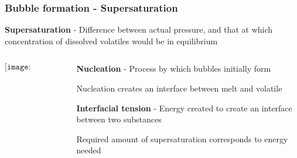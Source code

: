 \documentclass{beamer}
\begin{document}
\begin{frame}
  \frametitle{Bubble formation - Supersaturation}

  \textbf{Supersaturation} - Difference between actual pressure, and that at which concentration of dissolved volatiles would be in equilibrium

  \begin{columns}[t]

    \begin{column}{0.5\paperwidth}

      $$\texttt{[image: supersat.png]}$$

    \end{column}

    \begin{column}{0.5\paperwidth}

      \textbf{Nucleation} - Process by which bubbles initially form \\

      \vspace{0.5cm}

      Nucleation creates an interface between melt and volatile \\

      \vspace{0.5cm}

      \textbf{Interfacial tension} - Energy created to create an interface between two substances \\

      \vspace{0.5cm}

      Required amount of supersaturation corresponds to energy needed \\
    \end{column}
    
  \end{columns}
  
\end{frame}
\end{document}
